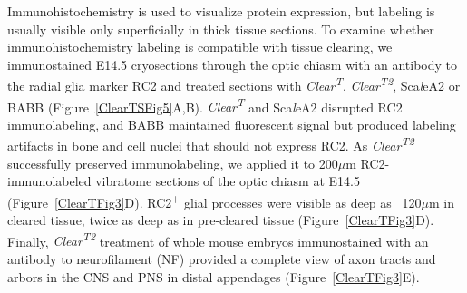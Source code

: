 Immunohistochemistry is used to visualize protein expression, but labeling is usually visible only superficially in thick tissue sections.
To examine whether immunohistochemistry labeling is compatible with tissue clearing, we immunostained E14.5 cryosections through the optic chiasm with an antibody to the radial glia marker RC2 and treated sections with \emph{Clear\textsuperscript{T}}, \emph{Clear\textsuperscript{T2}}, Sca\emph{l}eA2 or BABB (Figure~\ref{ClearTSFig5}A,B).
\emph{Clear\textsuperscript{T}} and Sca\emph{l}eA2 disrupted RC2 immunolabeling, and BABB maintained fluorescent signal but produced labeling artifacts in bone and cell nuclei that should not express RC2.
As \emph{Clear\textsuperscript{T2}} successfully preserved immunolabeling, we applied it to 200$\mu$m RC2-immunolabeled vibratome sections of the optic chiasm at E14.5 (Figure~\ref{ClearTFig3}D). %
RC2\textsuperscript{+} glial processes were visible as deep as ~120$\mu$m in cleared tissue, twice as deep as in pre-cleared tissue (Figure~\ref{ClearTFig3}D).
Finally, \emph{Clear\textsuperscript{T2}} treatment of whole mouse embryos immunostained with an antibody to neurofilament (NF) provided a complete view of axon tracts and arbors in the CNS and PNS in distal appendages (Figure~\ref{ClearTFig3}E).
